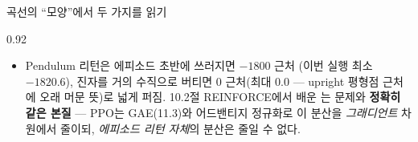 \begin{frame}{곡선의 ``모양''에서 두 가지를 읽기}
\begin{center}\begin{varwidth}{0.92\textwidth}
  \begin{itemize}
    \item {}
      \small
      Pendulum 리턴은 에피소드 초반에 쓰러지면 $-1800$ 근처
      (이번 실행 최소 $-1820.6$), 진자를 거의 수직으로 버티면
      0 근처(최대 $0.0$ — upright 평형점 근처에 오래 머문 뜻)로
      넓게 퍼짐. 10.2절 REINFORCE에서 배운
      는 문제와
      \textbf{정확히 같은 본질} — PPO는 GAE(11.3)와 어드밴티지
      정규화로 이 분산을 \textit{그래디언트} 차원에서 줄이되,
      \textit{에피소드 리턴 자체}의 분산은 줄일 수 없다.
    
  \end{itemize}
\end{varwidth}\end{center}
\end{frame}
